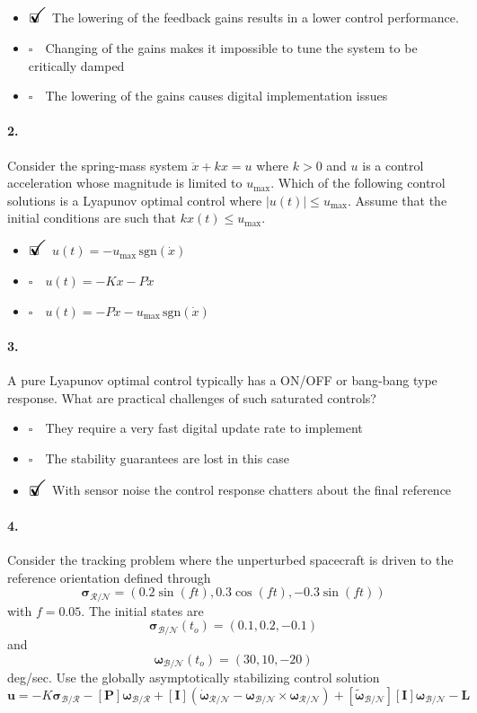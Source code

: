 \documentclass[12pt, a4paper]{article}
\newcommand{\ans}{\item[]$\rlap{\LARGE{\checkmark}}\square\quad$}
\newcommand{\noans}{\item[]$\square\quad$}
\begin{document}
\begin{itemize}
\ans The lowering of the feedback gains results in a lower control performance.
\noans Changing of the gains makes it impossible to tune the system to be critically damped
\noans The lowering of the gains causes digital implementation issues
\end{itemize}

\paragraph{2.}
Consider the spring-mass system $\ddot{x} + kx = u$ where $k>0$ and $u$ is a control acceleration whose magnitude is limited to $u_\text{{max}}$. Which of the following control solutions is a Lyapunov optimal control where $|u(t)|\leq u_\text{{max}}$. Assume that the initial conditions are such that $kx(t) \leq u_\text{{max}}$.

\begin{itemize}
\ans $u(t) = -u_\text{{max}}\, \text{sgn}(\dot{x})$
\noans $u(t) = -Kx - P\dot{x}$
\noans $u(t) = -P\dot{x} - u_\text{{max}}\, \text{sgn}(\dot{x})$
\end{itemize}

\paragraph{3.}
A pure Lyapunov optimal control typically has a ON/OFF or bang-bang type response.  What are practical challenges of such saturated controls?

\begin{itemize}
\noans They require a very fast digital update rate to implement
\noans The stability guarantees are lost in this case
\ans With sensor noise the control response chatters about the final reference
\end{itemize}

\paragraph{4.}
Consider the tracking problem where the unperturbed spacecraft is driven to the reference orientation defined through 
$$\bm{\sigma}_{\mathcal{R}/\mathcal{N}} = \left( 0.2\sin(ft), 0.3\cos(ft), -0.3\sin(ft) \right)$$ 
with $f=0.05$. The initial states are 
$$\bm{\sigma}_{\mathcal{B}/\mathcal{N}}(t_{o}) = (0.1,0.2,-0.1)$$ 
and 
$$\bm{\omega}_{\mathcal{B}/\mathcal{N}}(t_{o}) = (30,10,-20)$$ deg/sec. Use the globally asymptotically stabilizing control solution 
$$ \bm{u} = -K\bm{\sigma}_{\mathcal{B}/\mathcal{R}} - [\bm{P}] \bm{\omega}_{\mathcal{B}/\mathcal{R}} + [\bm{I}](\dot{\bm{\omega}}_{\mathcal{R}/\mathcal{N}} - \bm{\omega}_{\mathcal{B}/\mathcal{N}} \times \bm{\omega}_{\mathcal{R}/\mathcal{N}}) + [\tilde{\bm{\omega}}_{\mathcal{B}/\mathcal{N}}][\bm{I}]\bm{\omega}_{\mathcal{B}/\mathcal{N}} - \bm{L}$$
\end{document}
